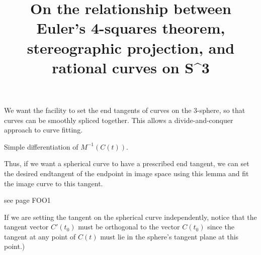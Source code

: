 \title{On the relationship between Euler's 4-squares theorem, 
	stereographic projection, and rational curves on S^3}

We want the facility to set the end tangents of curves on the 3-sphere,
so that curves can be smoothly spliced together.
This allows a divide-and-conquer approach to curve fitting.

\prf
Simple differentiation of $M^{-1}(C(t))$.
\QED

Thus, if we want a spherical curve to have a prescribed end tangent,
we can set the desired endtangent of the endpoint in image space
using this lemma and fit the image curve to this tangent.

see page FOO1

If we are setting the tangent on the spherical curve independently, 
notice that the tangent vector $C'(t_0)$ must be orthogonal to the vector $C(t_0)$
since the tangent at any point of $C(t)$ must lie in the sphere's tangent plane
at this point.)
